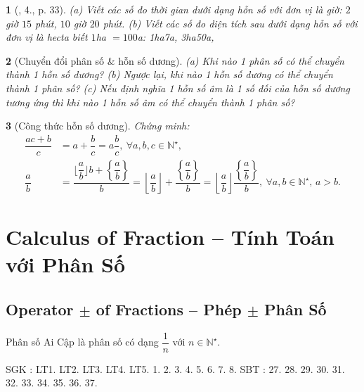 \documentclass{article}
\newtheorem{baitoan}{}
\begin{document}
\begin{baitoan}[\cite{SGK_Toan_6_Canh_Dieu_tap_2}, 4., p. 33]
	(a) Viết các số đo thời gian dưới dạng hỗn số với đơn vị là giờ: $2$ giờ $15$ phút, $10$ giờ $20$ phút. (b) Viết các số đo diện tích sau dưới dạng hỗn số với đơn vị là hecta biết $1$\emph{ha} $= 100$\emph{a}: \emph{1ha7a, 3ha50a},
\end{baitoan}

\begin{baitoan}[Chuyển đổi phân số \& hỗn số dương]
	(a) Khi nào 1 phân số có thể chuyển thành 1 hỗn số dương? (b) Ngược lại, khi nào 1 hỗn số dương có thể chuyển thành 1 phân số? (c) Nếu định nghĩa 1 \emph{hỗn số âm} là 1 số đối của hỗn số dương tương ứng thì khi nào 1 hỗn số âm có thể chuyển thành 1 phân số?
\end{baitoan}

\begin{baitoan}[Công thức hỗn số dương]
	Chứng minh:
	\begin{align*}
		\dfrac{ac + b}{c} &= a + \dfrac{b}{c} = a\dfrac{b}{c},\ \forall a,b,c\in\mathbb{N}^\star,\\
		\dfrac{a}{b} &= \dfrac{\lfloor\dfrac{a}{b}\rfloor b + \left\{\dfrac{a}{b}\right\}}{b} = \left\lfloor\dfrac{a}{b}\right\rfloor + \dfrac{\left\{\dfrac{a}{b}\right\}}{b} = \left\lfloor\dfrac{a}{b}\right\rfloor\dfrac{\left\{\dfrac{a}{b}\right\}}{b},\ \forall a,b\in\mathbb{N}^\star,\, a > b.
	\end{align*}
\end{baitoan}


\section{Calculus of Fraction -- Tính Toán với Phân Số}

\subsection{Operator $\pm$ of Fractions -- Phép $\pm$ Phân Số}
 Phân số Ai Cập là phân số có dạng $\dfrac{1}{n}$ với $n\in\mathbb{N}^\star$.

\noindent SGK \cite[Chap. V, \S3, pp. 34--38]{SGK_Toan_6_Canh_Dieu_tap_2}: LT1. LT2. LT3. LT4. LT5. 1. 2. 3. 4. 5. 6. 7. 8. SBT \cite[Chap. V, \S3, pp. 37--38]{SBT_Toan_6_Canh_Dieu_tap_2}: 27. 28. 29. 30. 31. 32. 33. 34. 35. 36. 37.
\end{document}
